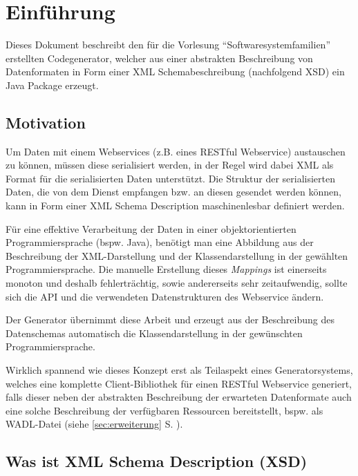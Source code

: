 \documentclass[a4paper]{scrartcl}
\author{\documentAuthor}
\date{\today}
\begin{document}
    
    \clearpage

    \tableofcontents
    \clearpage

    \section{Einführung}

    Dieses Dokument beschreibt den für die Vorlesung \enquote{Softwaresystemfamilien} erstellten Codegenerator, welcher aus einer abstrakten Beschreibung von Datenformaten in Form einer \gls{XML} Schemabeschreibung (nachfolgend \gls{XSD}) ein Java Package erzeugt.

    \subsection{Motivation}

    Um Daten mit einem Webservices (z.B. eines \gls{RESTful} Webservice) austauschen zu können, müssen diese serialisiert werden, in der Regel wird dabei XML als Format für die serialisierten Daten unterstützt. Die Struktur der serialisierten Daten, die von dem Dienst empfangen bzw. an diesen gesendet werden können, kann in Form einer XML Schema Description maschinenlesbar definiert werden.

    Für eine effektive Verarbeitung der Daten in einer objektorientierten Programmiersprache (bspw. Java), benötigt man eine Abbildung aus der Beschreibung der XML-Darstellung und der Klassendarstellung in der gewählten Programmiersprache. Die manuelle Erstellung dieses \emph{Mappings} ist einerseits monoton und deshalb fehlerträchtig, sowie andererseits sehr zeitaufwendig, sollte sich die API und die verwendeten Datenstrukturen des Webservice ändern.

    Der Generator übernimmt diese Arbeit und erzeugt aus der Beschreibung des Datenschemas automatisch die Klassendarstellung in der gewünschten Programmiersprache.

    Wirklich spannend wie dieses Konzept erst als Teilaspekt eines Generatorsystems, welches eine komplette Client-Bibliothek für einen RESTful Webservice generiert, falls dieser neben der abstrakten Beschreibung der erwarteten Datenformate auch eine solche Beschreibung der verfügbaren Ressourcen bereitstellt, bspw. als \gls{WADL}-Datei (siehe \cref{sec:erweiterung} S. \pageref{sec:erweiterung}).

    \subsection{Was ist XML Schema Description (XSD)}
\end{document}
